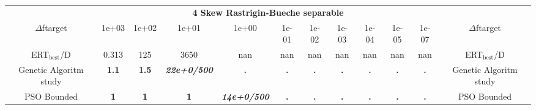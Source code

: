 \begin{tabular}{cccccccccccc}
 & \multicolumn{10}{c}{{\normalsize \textbf{4 Skew Rastrigin-Bueche separable}}}\\
$\Delta$ftarget& 1e+03& 1e+02& 1e+01& 1e+00& 1e-01& 1e-02& 1e-03& 1e-04& 1e-05& 1e-07 & $\Delta$ftarget \\
ERT$_{\textrm{best}}$/D& 0.313& 125& 3650& nan& nan& nan& nan& nan& nan& nan & ERT$_{\textrm{best}}$/D \\
\hline
Genetic Algoritm study & \textbf{1.1} & \textbf{1.5} & \textbf{\textit{22e+0}\textit{/500}} & \textbf{.} & \textbf{.} & \textbf{.} & \textbf{.} & \textbf{.} & \textbf{.} & \textbf{.} & Genetic Algoritm study \cite{add_an_entry_for_Genetic Algoritm study_in_bbob.bib}\\
PSO Bounded & \textbf{1} & \textbf{1} & \textbf{1} & \textbf{\textit{14e+0}\textit{/500}} & \textbf{.} & \textbf{.} & \textbf{.} & \textbf{.} & \textbf{.} & \textbf{.} & PSO Bounded \cite{add_an_entry_for_PSO Bounded_in_bbob.bib}
\end{tabular}
